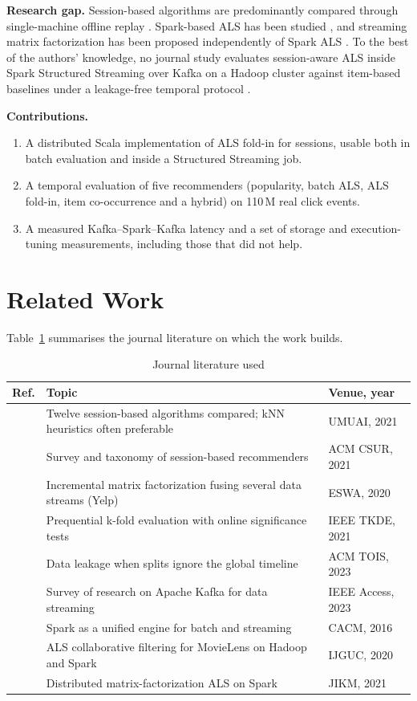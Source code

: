\documentclass[10pt,journal]{IEEEtran}
\begin{document}
\textbf{Research gap.} Session-based algorithms are predominantly compared through single-machine offline replay \cite{ludewig2021,wang2021survey}. Spark-based ALS has been studied \cite{li2020als,kumar2021edmfals}, and streaming matrix factorization has been proposed independently of Spark ALS \cite{jakomin2020simf}. To the best of the authors' knowledge, no journal study evaluates session-aware ALS inside Spark Structured Streaming over Kafka on a Hadoop cluster against item-based baselines under a leakage-free temporal protocol \cite{ji2023leakage}.

\textbf{Contributions.}
\begin{enumerate}
\item A distributed Scala implementation of ALS fold-in for sessions, usable both in batch evaluation and inside a Structured Streaming job.
\item A temporal evaluation of five recommenders (popularity, batch ALS, ALS fold-in, item co-occurrence and a hybrid) on 110\,M real click events.
\item A measured Kafka--Spark--Kafka latency and a set of storage and execution-tuning measurements, including those that did not help.
\end{enumerate}

\section{Related Work}
Table~\ref{tab:lit} summarises the journal literature on which the work builds.

\begin{table}[!t]
\caption{Journal literature used}
\label{tab:lit}
\centering
\footnotesize
\begin{tabular}{@{}p{0.5cm}p{5.2cm}p{2.1cm}@{}}
\hline
\textbf{Ref.} & \textbf{Topic} & \textbf{Venue, year}\\\hline
\cite{ludewig2021} & Twelve session-based algorithms compared; kNN heuristics often preferable & UMUAI, 2021\\
\cite{wang2021survey} & Survey and taxonomy of session-based recommenders & ACM CSUR, 2021\\
\cite{jakomin2020simf} & Incremental matrix factorization fusing several data streams (Yelp) & ESWA, 2020\\
\cite{vinagre2021eval} & Prequential k-fold evaluation with online significance tests & IEEE TKDE, 2021\\
\cite{ji2023leakage} & Data leakage when splits ignore the global timeline & ACM TOIS, 2023\\
\cite{raptis2023kafka} & Survey of research on Apache Kafka for data streaming & IEEE Access, 2023\\
\cite{zaharia2016spark} & Spark as a unified engine for batch and streaming & CACM, 2016\\
\cite{li2020als} & ALS collaborative filtering for MovieLens on Hadoop and Spark & IJGUC, 2020\\
\cite{kumar2021edmfals} & Distributed matrix-factorization ALS on Spark & JIKM, 2021\\\hline
\end{tabular}
\end{table}
\end{document}
